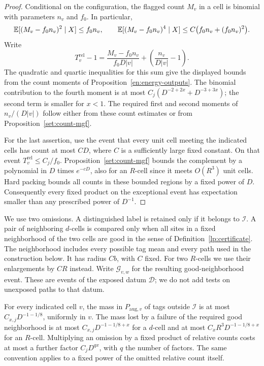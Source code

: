 \begin{proof}
Conditional on the configuration, the flagged count $M_v$ in a cell is
binomial with parameters $n_v$ and $f_0$.  In particular,
\[
 \mathbb E[(M_v-f_0n_v)^2\mid X]\le f_0n_v,
 \qquad
 \mathbb E[(M_v-f_0n_v)^4\mid X]
       \le C\bigl(f_0n_v+(f_0n_v)^2\bigr).
\]
Write
\[
 T_v^{\mathrm{rel}}-1
 =\frac{M_v-f_0n_v}{f_0D|v|}
        +\left(\frac{n_v}{D|v|}-1\right).
\]
The quadratic and quartic inequalities for this sum give the displayed
bounds from the count moments of Proposition~\ref{en:energy-outputs}.  The binomial contribution
to the fourth moment is at most
$C_j(D^{-2+2x}+D^{-3+3x})$; the second term is smaller for $x<1$.
The required first and second moments of $n_v/(D|v|)$ follow either
from these count estimates or from Proposition~\ref{set:count-mgf}.

For the last assertion, use the event that every unit cell meeting the
indicated cells has count at most $CD$, where $C$ is a sufficiently large
fixed constant.  On that event $T_v^{\mathrm{rel}}\le C_j/f_0$.
Proposition~\ref{set:count-mgf} bounds the complement by a polynomial in $D$
times $e^{-cD}$, also for an $R$-cell since it meets $O(R^3)$ unit cells.
Hard packing bounds all counts in these bounded regions by a fixed
power of $D$.  Consequently every fixed product on the exceptional
event has expectation smaller than any prescribed power of $D^{-1}$.
\end{proof}

We use two omissions.  A distinguished label is retained only if it
belongs to $\mathcal I$.  A pair of neighboring $d$-cells is compared only when
all sites in a fixed neighborhood of the two cells are good in the
sense of Definition~\ref{lp:certificate}.  The neighborhood includes
every possible tag mean and every path used in the construction below.
It has radius $C b$, with $C$ fixed.  For two $R$-cells we use their
enlargements by $CR$ instead.  Write $\mathcal G_{v,w}$ for the resulting good-neighborhood event.
These are events of the exposed datum $\mathcal D$;
we do not add tests on unexposed paths to that datum.

\begin{lemma}
\label{palm:omissions}
For every indicated cell $v$, the mass in
$P_{\mathrm{aug},v}$ of tags outside $\mathcal I$ is at most
$C_{x,j}D^{-1-1/8}$, uniformly in $v$.  The mass lost by a failure of
the required good neighborhood is at most
$C_{x,j}D^{-1-1/8+x}$ for a $d$-cell and at most
$C_xR^3D^{-1-1/8+x}$ for an $R$-cell.
Multiplying an omission by a fixed product of relative counts costs
at most a further factor $C_jD^{qx}$, with $q$ the number of factors.
The same convention applies to a fixed power of the omitted relative
count itself.
\end{lemma}

